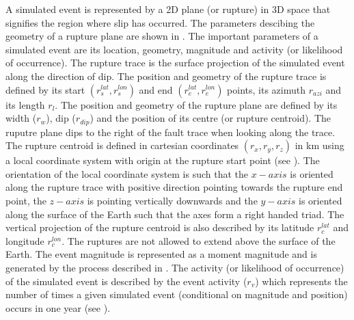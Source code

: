 A simulated event is represented by a 2D plane
(or rupture) in 3D space that signifies the region where slip has
occurred. The parameters descibing the geometry of a rupture plane are shown in
. The important parameters of a simulated
event are its location, geometry, magnitude
and activity (or likelihood of occurrence). The rupture trace is
the surface projection of the simulated event along the direction of dip. The position and geometry of
the rupture trace is defined by its start $(r_s^{lat},r_s^{lon})$
and end $(r_e^{lat},r_e^{lon})$ points, its azimuth $r_{azi}$ and
its length $r_l$. The position and geometry of the rupture plane
are defined by its width ($r_w$), dip ($r_{dip}$) and the position of
its centre (or rupture centroid). The ruputre plane dips to the right of the fault trace when looking along the trace. 
The rupture centroid is defined
in cartesian coordinates $(r_x,r_y,r_z)$ in km using a local
coordinate system with origin at the rupture start point (see
). The orientation of the local coordinate
system is such that the $x-axis$ is oriented along the rupture
trace with positive direction pointing towards the rupture end
point, the $z-axis$ is pointing vertically downwards and the
$y-axis$ is oriented along the surface of the Earth such that
the axes form a right handed triad. The vertical projection of the
rupture centroid is also described by its latitude $r_c^{lat}$ and
longitude $r_c^{lon}$. The ruptures are not allowed to extend above the surface of the Earth.
The event magnitude is represented as a
moment magnitude and is generated by the process described in
. The activity (or likelihood of
occurrence) of the simulated event is
described by the event activity ($r_v$) which represents the number of
times a given simulated event (conditional
on magnitude and position) occurs in one year (see
).


